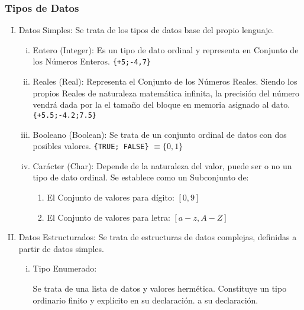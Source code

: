 \subsubsection{Tipos de Datos}

\begin{enumerate}[I.]

\item Datos Simples: Se trata de los tipos de datos base del propio lenguaje.

{

\begin{enumerate}[i.]
 
\item Entero (Integer): Es un tipo de dato ordinal y representa en Conjunto de los Números Enteros.
{
\ejem \texttt{\{+5;-4,7\}}
}
\item Reales (Real): Representa el Conjunto de los Números Reales. Siendo los propios Reales de naturaleza matemática infinita, la precisión del número vendrá dada por la el tamaño del bloque en memoria asignado al dato.
{
\ejem \texttt{\{+5.5;-4.2;7.5\}}
}
\item Booleano (Boolean): Se trata de un conjunto ordinal de datos con dos posibles valores.
{
\form \texttt{\{TRUE; FALSE\}} $\equiv \{0,1\}$
}
\item Carácter (Char): Depende de la naturaleza del valor, puede ser o no un tipo de dato ordinal. Se establece como un Subconjunto de:
{
\begin{enumerate}

\item El Conjunto de valores para dígito: $[0,9]$

\item El Conjunto de valores para letra: $[a-z,A-Z]$
\end{enumerate}
}
\end{enumerate}

}


\item Datos Estructurados: Se trata de estructuras de datos complejas, definidas a partir de datos simples. {

\begin{enumerate}[i.]

\item {}Tipo Enumerado: {Se trata de una lista de datos y valores hermética. Constituye un tipo ordinario finito y explícito en su declaración.
a su declaración.

}
\end{enumerate}}
\end{enumerate}
